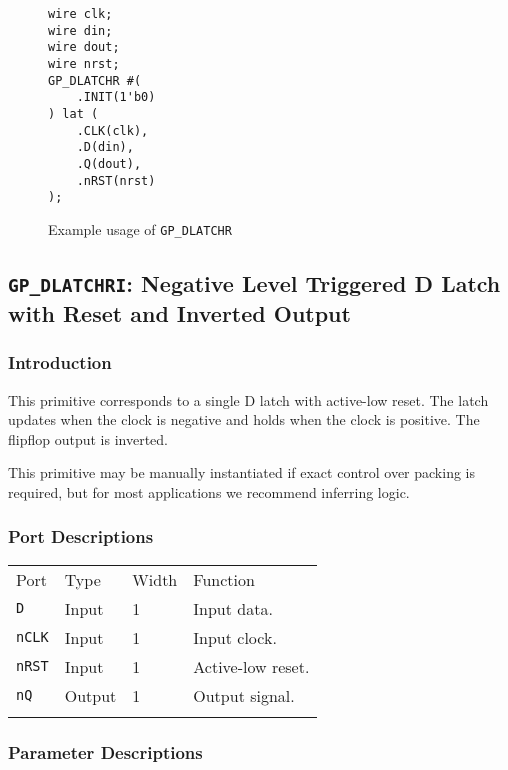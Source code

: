 \documentclass[11pt]{article}
\newcommand{\tokenstyle}[1]{\texttt{#1}}
\newcommand{\whenstyle}[1]{{\fontseries{sb}\selectfont#1}}
\newcommand{\thinhline}{\Xhline{1\arrayrulewidth}}
\newcommand{\thickhline}{\Xhline{2.5\arrayrulewidth}}
\begin{document}
\begin{figure}[h]
\begin{lstlisting}
wire clk;
wire din;
wire dout;
wire nrst;
GP_DLATCHR #(
	.INIT(1'b0)
) lat (
	.CLK(clk),
	.D(din),
	.Q(dout),
	.nRST(nrst)
);
\end{lstlisting}
\caption{Example usage of \tokenstyle{GP\_DLATCHR}}
\label{gp-dlatchr-example}
\end{figure}


\pagebreak
\subsection{\tokenstyle{GP\_DLATCHRI}: Negative Level Triggered D Latch with Reset and Inverted Output}
\label{gp-latchri}

\subsubsection{Introduction}
This primitive corresponds to a single D latch with active-low reset. The latch updates when the clock is negative and holds
when the clock is positive. The flipflop output is inverted.

This primitive may be manually instantiated if exact control over packing is required, but for most applications we
recommend inferring logic.

\subsubsection{Port Descriptions}

\begin{tabularx}{\textwidth}{lllX}
\thinhline
\whenstyle{Port} & \whenstyle{Type} & \whenstyle{Width} & \whenstyle{Function} \\
\thickhline
\tokenstyle{D} & Input & 1 & Input data. \\
\thinhline
\tokenstyle{nCLK} & Input & 1 & Input clock. \\
\thinhline
\tokenstyle{nRST} & Input & 1 & Active-low reset. \\
\thinhline
\tokenstyle{nQ} & Output & 1 & Output signal. \\
\thinhline
\end{tabularx}

\subsubsection{Parameter Descriptions}
\end{document}
